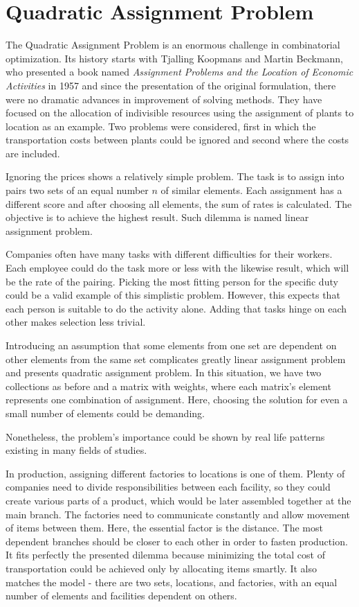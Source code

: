 \section{Quadratic Assignment Problem}
\label{section:background_qap}

The Quadratic Assignment Problem is an enormous challenge in combinatorial optimization.
Its history starts with Tjalling Koopmans and Martin Beckmann, who presented a book named \textit{Assignment Problems and the Location of Economic Activities} in 1957 \cite{koopmans-beckmann1957} and since the presentation of the original formulation, there were no dramatic advances in improvement of solving methods.
They have focused on the allocation of indivisible resources using the assignment of plants to location as an example.
Two problems were considered, first in which the transportation costs between plants could be ignored and second where the costs are included.

Ignoring the prices shows a relatively simple problem.
The task is to assign into pairs two sets of an equal number $n$ of similar elements.
Each assignment has a different score and after choosing all elements, the sum of rates is calculated.
The objective is to achieve the highest result.
Such dilemma is named linear assignment problem.

Companies often have many tasks with different difficulties for their workers.
Each employee could do the task more or less with the likewise result, which will be the rate of the pairing.
Picking the most fitting person for the specific duty could be a valid example of this simplistic problem.
However, this expects that each person is suitable to do the activity alone.
Adding that tasks hinge on each other makes selection less trivial.

Introducing an assumption that some elements from one set are dependent on other elements from the same set complicates greatly linear assignment problem and presents quadratic assignment problem.
In this situation, we have two collections as before and a matrix with weights, where each matrix's element represents one combination of assignment.
Here, choosing the solution for even a small number of elements could be demanding.

Nonetheless, the problem's importance could be shown by real life patterns existing in many fields of studies.

In production, assigning different factories to locations is one of them.
Plenty of companies need to divide responsibilities between each facility, so they could create various parts of a product, which would be later assembled together at the main branch.
The factories need to communicate constantly and allow movement of items between them.
Here, the essential factor is the distance.
The most dependent branches should be closer to each other in order to fasten production.
It fits perfectly the presented dilemma because minimizing the total cost of transportation could be achieved only by allocating items smartly.
It also matches the model - there are two sets, locations, and factories, with an equal number of elements and facilities dependent on others.

